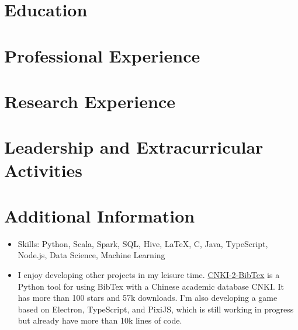 \documentclass{resumeEN}
\begin{document}
\section{Education}

\pennmaster
\thuundergrad
\umnexchange

\section{Professional Experience}

\msra
\bytedance

\section{Research Experience}

\ryanresearch

\section{Leadership and Extracurricular Activities}

\eydatascience

\section{Additional Information}

\vspace{0.618ex}
\begin{itemize}
\item Skills: Python, Scala, Spark, SQL, Hive, {\LaTeX}, C, Java, TypeScript, Node.js, Data Science, Machine Learning
\item I enjoy developing other projects in my leisure time. \href{https://github.com/Vopaaz/CNKI_2_BibTeX}{CNKI-2-BibTex} is a Python tool for using BibTex with a Chinese academic database CNKI. It has more than 100 stars and 57k downloads. I'm also developing a game based on Electron, TypeScript, and PixiJS, which is still working in progress but already have more than 10k lines of code.
\end{itemize}
\end{document}
